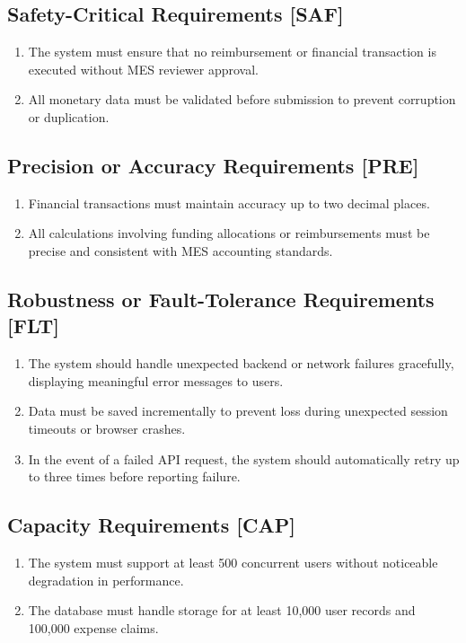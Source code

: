 \documentclass[12pt]{article}
\begin{document}
  \subsection{Safety-Critical Requirements [SAF]}
    \begin{enumerate}
        \item The system must ensure that no reimbursement or financial transaction is executed without MES reviewer approval.
        \item All monetary data must be validated before submission to prevent corruption or duplication.
    \end{enumerate}

  \subsection{Precision or Accuracy Requirements [PRE]}
    \begin{enumerate}
        \item Financial transactions must maintain accuracy up to two decimal places.
        \item All calculations involving funding allocations or reimbursements must be precise and consistent with MES accounting standards.
    \end{enumerate}

  \subsection{Robustness or Fault-Tolerance Requirements [FLT]}
    \begin{enumerate}
        \item The system should handle unexpected backend or network failures gracefully, displaying meaningful error messages to users.
        \item Data must be saved incrementally to prevent loss during unexpected session timeouts or browser crashes.
        \item In the event of a failed API request, the system should automatically retry up to three times before reporting failure.
    \end{enumerate}

  \subsection{Capacity Requirements [CAP]}
    \begin{enumerate}
        \item The system must support at least 500 concurrent users without noticeable degradation in performance.
        \item The database must handle storage for at least 10,000 user records and 100,000 expense claims.
    \end{enumerate}
\end{document}
